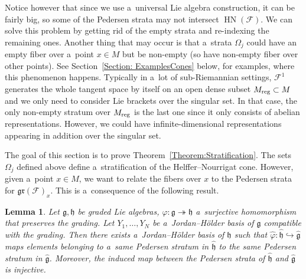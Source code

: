 \documentclass[pdftex]{sigma}
\newcommand{\F}{\mathcal{F}} %
\newcommand{\g}{\mathfrak{g}} %
\newcommand{\HN}{\operatorname{HN}} %
\newcommand{\Fb}{\mathcal{F}} %
\newcommand{\gr}{\mathfrak{gr}} %
\numberwithin{equation}{section}
\newtheorem{lem}[thm]{Lemma}
\theoremstyle{definition}
\begin{document}
Notice however that since we use a~universal Lie algebra construction, it can be fairly big, so some of the Pedersen strata may not intersect $\HN(\Fb)$. We can solve this problem by getting rid of the empty strata and re-indexing the remaining ones. Another thing that may occur is that a~strata $\Omega_j$ could have an empty fiber over a~point $x \in M$ but be non-empty (so have non-empty fiber over other points). See Section~\ref{Section: ExamplesCones} below, for examples, where this phenomenon happens. Typically in a~lot of sub-Riemannian settings, $\F^1$ generates the whole tangent space by itself on an open dense subset $M_{\rm reg}\subset M$ and we only need to consider Lie brackets over the singular set. In that case, the only non-empty stratum over $M_{\rm reg}$ is the last one since it only consists of abelian representations. However, we could have infinite-dimensional representations appearing in addition over the singular set.

The goal of this section is to prove Theorem~\ref{Theorem:Stratification}. The sets $\Omega_j$ defined above define a~stratification of the Helffer--Nourrigat cone. However, given a~point $x \in M$, we want to relate the fibers over $x$ to the Pedersen strata for $\gr(\Fb)_x$. This is a~consequence of the following result.

\begin{lem}
 Let $\g,\mathfrak{h}$ be graded Lie algebras, $\varphi\colon \g\twoheadrightarrow\mathfrak{h}$ a~surjective homomorphism that preserves the grading. Let $Y_1, \dots, Y_N$ be a~Jordan--H\"older basis of $\g$ compatible with the grading. Then there exists a~Jordan--H\"older basis of $\mathfrak{h}$ such that $\widehat{\varphi} \colon \widehat{\mathfrak{h}} \hookrightarrow \widehat{\g}$ maps elements belonging to a~same Pedersen stratum in $\widehat{\mathfrak{h}}$ to the same Pedersen stratum in $\widehat{\g}$. Moreover, the induced map between the Pedersen strata of $\widehat{\mathfrak{h}}$ and $\widehat{\g}$ is injective.
\end{lem}
\end{document}
